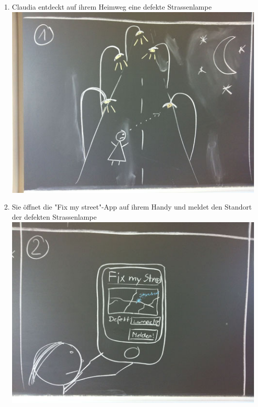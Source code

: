 \begin{enumerate}
\item Claudia entdeckt auf ihrem Heimweg eine defekte Strassenlampe \\ \includegraphics[scale=0.4]{images/usecase2-fixmystreet/storyboard/fixmystreet-storyboard-1.jpg}
\item Sie öffnet die "Fix my street"-App auf ihrem Handy und meldet den Standort der defekten Strassenlampe \\ \includegraphics[scale=0.4]{images/usecase2-fixmystreet/storyboard/fixmystreet-storyboard-2.jpg}

\end{enumerate}
